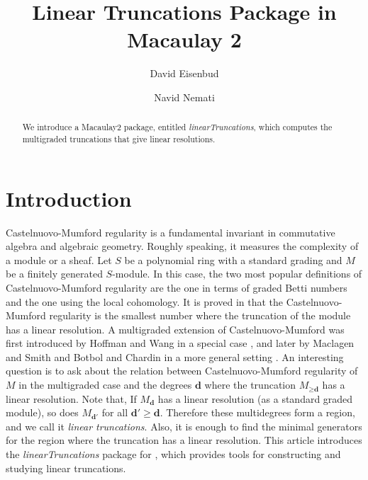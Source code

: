 \documentclass[11pt]{amsart}
\theoremstyle{definition}
\begin{document}
\title[LinearTruncations.m2]{Linear Truncations Package in Macaulay 2} 
\author{David Eisenbud}
\address{Department of Mathematics, University of California at Berkeley and the Mathematical Sciences Research Institute, Berkeley, CA 94720, USA}
\author{Navid Nemati}
\address{ Universit\'{e} ́ C\^{o}te d'Azur, Inria, 2004 route des Lucioles, 06902 Sophia Antipolis, France}


\begin{abstract}
 We introduce a  Macaulay2 package, entitled \textit{linearTruncations}, which computes the multigraded truncations that give linear resolutions.
\end{abstract}

\maketitle
\section{Introduction}

\noindent Castelnuovo-Mumford regularity is a fundamental invariant in commutative algebra and algebraic geometry. Roughly speaking, it measures the complexity of a module or a sheaf. Let $S$ be a polynomial ring with a standard grading and $M$ be a finitely generated $S$-module. In this case, the two most popular definitions of Castelnuovo-Mumford regularity are the one in terms of graded Betti numbers and the one using the local cohomology. It is proved in \cite{EisenbudGoto} that the Castelnuovo-Mumford regularity is the smallest number where the truncation of the module has a linear resolution. A multigraded extension of Castelnuovo-Mumford  was first introduced by Hoffman and Wang in a special case \cite{HoffmanWang}, and later by Maclagen and Smith \cite{MaclagenSmith} and Botbol and Chardin in a more general setting \cite{BotbolChardin}. An interesting question is to ask about the relation between Castelnuovo-Mumford regularity of $M$ in the multigraded case and the degrees $\textbf{d}$ where the truncation $M_{\geq \textbf{d}}$ has a linear resolution.  Note that, If $M_{\textbf{d}}$ has a linear resolution (as a standard graded module), so does $M_{\textbf{d}'}$  for all $\textbf{d}'\geq \textbf{d}$. Therefore these multidegrees form a region, and we call it \textit{linear truncations}. Also, it is enough to find  the minimal generators for the region where the truncation has a linear resolution. This article introduces the \textit{linearTruncations} package for \cite{M2}, which provides tools for constructing and studying linear truncations.
\end{document}
